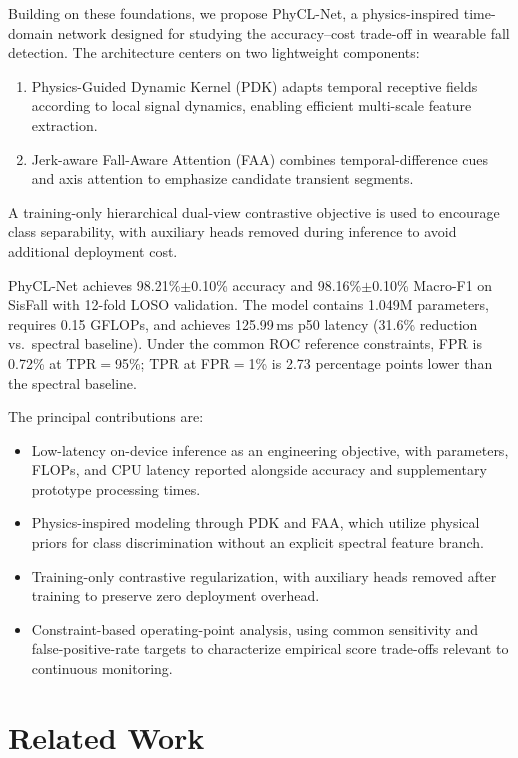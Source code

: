 \documentclass[jec]{acnsart}
\begin{document}
Building on these foundations, we propose PhyCL-Net, a physics-inspired time-domain network designed for studying the accuracy--cost trade-off in wearable fall detection. The architecture centers on two lightweight components:
\begin{enumerate}
\item Physics-Guided Dynamic Kernel (PDK) adapts temporal receptive fields according to local signal dynamics, enabling efficient multi-scale feature extraction.
\item Jerk-aware Fall-Aware Attention (FAA) combines temporal-difference cues and axis attention to emphasize candidate transient segments.
\end{enumerate}

A training-only hierarchical dual-view contrastive objective is used to encourage class separability, with auxiliary heads removed during inference to avoid additional deployment cost.

PhyCL-Net achieves 98.21\%$\pm$0.10\% accuracy and 98.16\%$\pm$0.10\% Macro-F1 on SisFall with 12-fold LOSO validation. The model contains 1.049M parameters, requires 0.15 GFLOPs, and achieves 125.99\,ms p50 latency (31.6\% reduction vs.\ spectral baseline). Under the common ROC reference constraints, FPR is 0.72\% at TPR${=}$95\%; TPR at FPR${=}$1\% is 2.73 percentage points lower than the spectral baseline.

The principal contributions are:
\begin{itemize}
\item Low-latency on-device inference as an engineering objective, with parameters, FLOPs, and CPU latency reported alongside accuracy and supplementary prototype processing times.
\item Physics-inspired modeling through PDK and FAA, which utilize physical priors for class discrimination without an explicit spectral feature branch.
\item Training-only contrastive regularization, with auxiliary heads removed after training to preserve zero deployment overhead.
\item Constraint-based operating-point analysis, using common sensitivity and false-positive-rate targets to characterize empirical score trade-offs relevant to continuous monitoring.
\end{itemize}

\section{Related Work}
\end{document}
